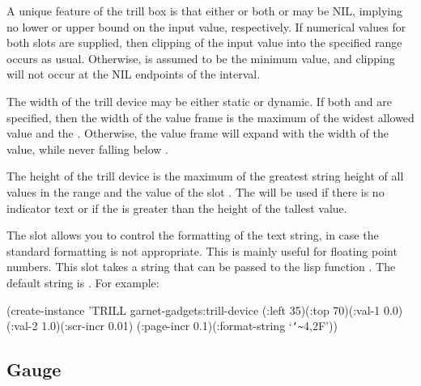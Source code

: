 A unique feature of the trill box is that either or both 
or  may be NIL, implying no lower or upper bound on the
input value, respectively.  If numerical values for both slots are
supplied, then clipping of the input value into the specified range
occurs as usual.  Otherwise,  is assumed to be the minimum
value, and clipping will not occur at the NIL endpoints of the
interval.

The width of the trill device may be either static or dynamic.  If
both  and  are specified, then the width of the
value frame is the maximum of the widest allowed value and the
.  Otherwise, the value frame will expand with
the width of the value, while never falling below
.

The height of the trill device is the maximum of the greatest string
height of all values in the range and the value of the slot
.  The  will be used if there is no
indicator text or if the  is greater than the height
of the tallest value.

\vspace{1 line}
\begin{group}
The  slot allows you to control the formatting of
the text string, in case the standard formatting is not appropriate.
This is mainly useful for floating point numbers.  This slot takes a
string that can be passed to the lisp function .  The
default string is .  For example:

\begin{programexample}
(create-instance 'TRILL garnet-gadgets:trill-device
   (:left 35)(:top 70)(:val-1 0.0)(:val-2 1.0)(:scr-incr 0.01)
   (:page-incr 0.1)(:format-string `{\tt\char`\~}4,2F'))
\end{programexample}
\end{group}


\begin{group}
\section{Gauge}
\label{gauge}

\begin{center}
\end{center}
\end{group}

